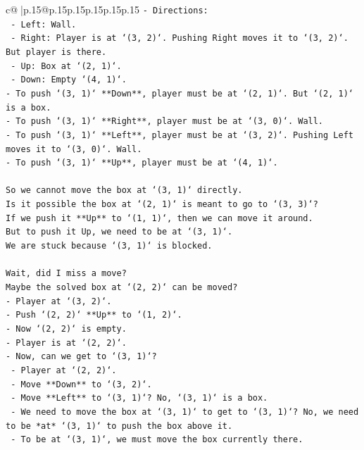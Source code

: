 \documentclass{article}
\begin{document}
{\begin{supertabular}{c@{$\;$}|p{.15\linewidth}@{}p{.15\linewidth}p{.15\linewidth}p{.15\linewidth}p{.15\linewidth}p{.15\linewidth}}
{{{\texttt{{-} Directions:} \\
\texttt{  {-} Left: Wall.} \\
\texttt{  {-} Right: Player is at `(3, 2)`. Pushing Right moves it to `(3, 2)`. But player is there.} \\
\texttt{  {-} Up: Box at `(2, 1)`.} \\
\texttt{  {-} Down: Empty `(4, 1)`.} \\
\texttt{{-} To push `(3, 1)` **Down**, player must be at `(2, 1)`. But `(2, 1)` is a box.} \\
\texttt{{-} To push `(3, 1)` **Right**, player must be at `(3, 0)`. Wall.} \\
\texttt{{-} To push `(3, 1)` **Left**, player must be at `(3, 2)`. Pushing Left moves it to `(3, 0)`. Wall.} \\
\texttt{{-} To push `(3, 1)` **Up**, player must be at `(4, 1)`.} \\
\\ 
\texttt{So we cannot move the box at `(3, 1)` directly.} \\
\texttt{Is it possible the box at `(2, 1)` is meant to go to `(3, 3)`?} \\
\texttt{If we push it **Up** to `(1, 1)`, then we can move it around.} \\
\texttt{But to push it Up, we need to be at `(3, 1)`.} \\
\texttt{We are stuck because `(3, 1)` is blocked.} \\
\\ 
\texttt{Wait, did I miss a move?} \\
\texttt{Maybe the solved box at `(2, 2)` can be moved?} \\
\texttt{{-} Player at `(3, 2)`.} \\
\texttt{{-} Push `(2, 2)` **Up** to `(1, 2)`.} \\
\texttt{{-} Now `(2, 2)` is empty.} \\
\texttt{{-} Player is at `(2, 2)`.} \\
\texttt{{-} Now, can we get to `(3, 1)`?} \\
\texttt{  {-} Player at `(2, 2)`.} \\
\texttt{  {-} Move **Down** to `(3, 2)`.} \\
\texttt{  {-} Move **Left** to `(3, 1)`? No, `(3, 1)` is a box.} \\
\texttt{  {-} We need to move the box at `(3, 1)` to get to `(3, 1)`? No, we need to be *at* `(3, 1)` to push the box above it.} \\
\texttt{  {-} To be at `(3, 1)`, we must move the box currently there.} \\
}}}
\end{supertabular}}
\end{document}
